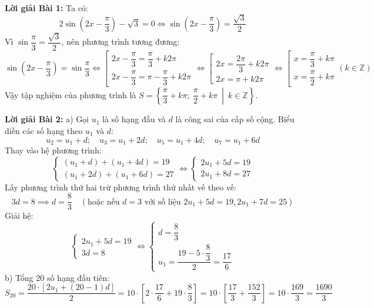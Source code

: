 \documentclass[12pt, a4paper]{article}
\begin{document}
\noindent \textbf{Lời giải Bài 1:}
Ta có:
$$2\sin\left(2x - \dfrac{\pi}{3}\right) - \sqrt{3} = 0 \iff \sin\left(2x - \dfrac{\pi}{3}\right) = \dfrac{\sqrt{3}}{2}$$
Vì $\sin\dfrac{\pi}{3} = \dfrac{\sqrt{3}}{2}$, nên phương trình tương đương:
$$\sin\left(2x - \dfrac{\pi}{3}\right) = \sin\dfrac{\pi}{3} \iff \left[\begin{array}{l} 2x - \dfrac{\pi}{3} = \dfrac{\pi}{3} + k2\pi \\ 2x - \dfrac{\pi}{3} = \pi - \dfrac{\pi}{3} + k2\pi \end{array}\right. \iff \left[\begin{array}{l} 2x = \dfrac{2\pi}{3} + k2\pi \\ 2x = \pi + k2\pi \end{array}\right. \iff \left[\begin{array}{l} x = \dfrac{\pi}{3} + k\pi \\ x = \dfrac{\pi}{2} + k\pi \end{array}\right. (k \in \mathbb{Z})$$
Vậy tập nghiệm của phương trình là $S = \left\{ \dfrac{\pi}{3} + k\pi; \ \dfrac{\pi}{2} + k\pi \ \middle| \ k \in \mathbb{Z} \right\}$.

\noindent \textbf{Lời giải Bài 2:}
a) Gọi $u_1$ là số hạng đầu và $d$ là công sai của cấp số cộng. Biểu diễn các số hạng theo $u_1$ và $d$:
$$u_2 = u_1 + d; \quad u_3 = u_1 + 2d; \quad u_5 = u_1 + 4d; \quad u_7 = u_1 + 6d$$
Thay vào hệ phương trình:
$$\begin{cases} (u_1 + d) + (u_1 + 4d) = 19 \\ (u_1 + 2d) + (u_1 + 6d) = 27 \end{cases} \iff \begin{cases} 2u_1 + 5d = 19 \\ 2u_1 + 8d = 27 \end{cases}$$
Lấy phương trình thứ hai trừ phương trình thứ nhất vế theo vế:
$$3d = 8 \implies d = \dfrac{8}{3} \quad (\text{hoặc nếu } d = 3 \text{ với số liệu } 2u_1+5d=19, 2u_1+7d=25)$$
Giải hệ:
$$\begin{cases} 2u_1 + 5d = 19 \\ 3d = 8 \end{cases} \iff \begin{cases} d = \dfrac{8}{3} \\ u_1 = \dfrac{19 - 5 \cdot \dfrac{8}{3}}{2} = \dfrac{17}{6} \end{cases}$$
b) Tổng 20 số hạng đầu tiên:
$$S_{20} = \dfrac{20 \cdot [2u_1 + (20 - 1)d]}{2} = 10 \cdot \left[ 2 \cdot \dfrac{17}{6} + 19 \cdot \dfrac{8}{3} \right] = 10 \cdot \left[ \dfrac{17}{3} + \dfrac{152}{3} \right] = 10 \cdot \dfrac{169}{3} = \dfrac{1690}{3}$$
\end{document}
